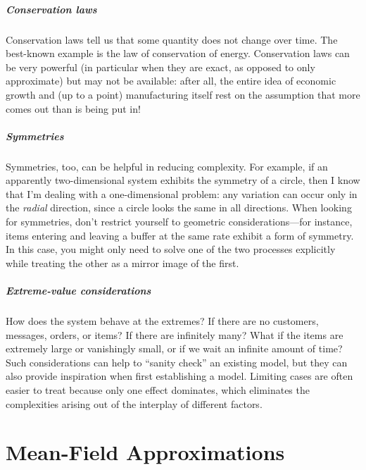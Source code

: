 \begin{unnumlist}
\subparagraph{Conservation laws}
\item Conservation  laws tell us that some quantity
  does not change over time. The best-known example is the law of
  conservation of energy. Conservation laws can be very powerful (in
  particular when they are exact, as opposed to only approximate) but
  may not be available: after all, the entire idea of economic growth
  and (up to a point) manufacturing itself rest on the assumption that
  more comes out than is being put in!\vspace*{6pt}

\subparagraph{Symmetries}
\item Symmetries,  too, can be helpful in reducing
  complexity. For example, if an apparently two-dimensional system
  exhibits the symmetry of a circle, then I know that I'm dealing with
  a one-dimensional problem: any variation can occur only in the
  \emph{radial} direction, since a circle looks the same in all
  directions. When looking for symmetries, don't restrict yourself to
  geometric considerations---for instance, items entering and leaving
  a buffer at the same rate exhibit a form of symmetry. In this case,
  you might only need to solve one of the two processes explicitly
  while treating the other as a mirror image of the first.\vspace*{6pt}

\subparagraph{Extreme-value considerations}
\item How does the system behave at the
  extremes? If there are no customers, messages, orders, or items? If
  there are infinitely many? What if the items are extremely large or
  vanishingly small, or if we wait an infinite amount of time?  Such
  considerations can help to ``sanity check'' an existing model, but
  they can also provide inspiration when  first establishing a model.
  Limiting cases are often easier to treat because only one effect
  dominates, which eliminates the complexities arising out of the
  interplay of different factors.
\end{unnumlist}



\section{Mean-Field Approximations}

